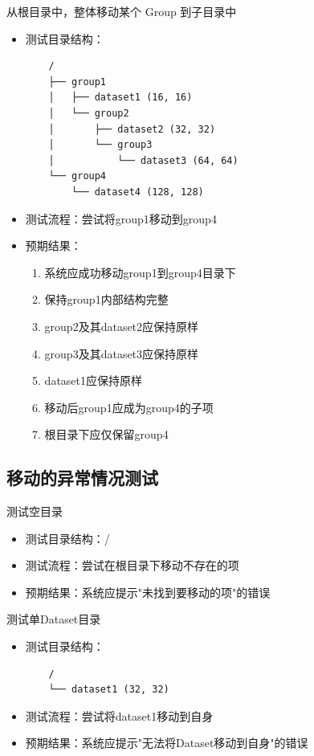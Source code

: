 \documentclass[a4paper,12pt]{report}	%
\begin{document}
从根目录中，整体移动某个 Group 到子目录中 
\begin{itemize}
    \item 测试目录结构：
    \begin{verbatim}
    /
    ├── group1
    │   ├── dataset1 (16, 16)
    │   └── group2
    │       ├── dataset2 (32, 32)
    │       └── group3
    │           └── dataset3 (64, 64)
    └── group4
        └── dataset4 (128, 128)
    \end{verbatim}
    \item 测试流程：尝试将group1移动到group4
    \item 预期结果：
    \begin{enumerate}
        \item 系统应成功移动group1到group4目录下
        \item 保持group1内部结构完整
        \item group2及其dataset2应保持原样
        \item group3及其dataset3应保持原样
        \item dataset1应保持原样
        \item 移动后group1应成为group4的子项
        \item 根目录下应仅保留group4
    \end{enumerate}
\end{itemize}

\subsection{移动的异常情况测试}
测试空目录
\begin{itemize}
    \item 测试目录结构：/
    \item 测试流程：尝试在根目录下移动不存在的项
    \item 预期结果：系统应提示"未找到要移动的项"的错误
\end{itemize}

测试单Dataset目录
\begin{itemize}
    \item 测试目录结构：
    \begin{verbatim}
    /
    └── dataset1 (32, 32)
    \end{verbatim}
    \item 测试流程：尝试将dataset1移动到自身
    \item 预期结果：系统应提示"无法将Dataset移动到自身"的错误
\end{itemize}
\end{document}
